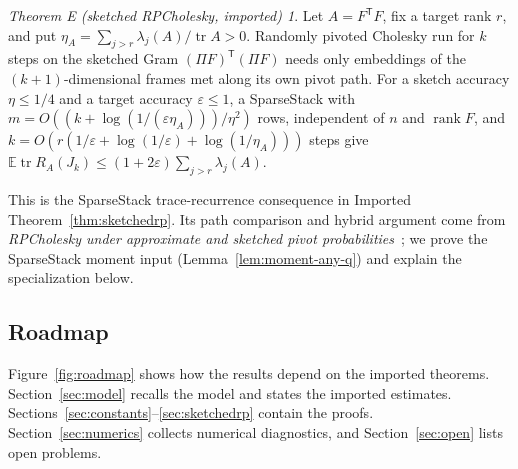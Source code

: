 \documentclass[11pt,a4paper]{article}
\theoremstyle{definition}
\theoremstyle{remark}
\newtheorem*{mainE}{Theorem E (sketched RPCholesky, imported)}
\newcommand{\E}{\mathbb E}
\newcommand{\tr}{\operatorname{tr}}
\newcommand{\rank}{\operatorname{rank}}
\newcommand{\eps}{\varepsilon}
\newcommand{\1}{\mathbf 1}
\newcommand{\T}{\mathsf T}
\begin{document}
\begin{mainE}
Let $A=F^\T F$, fix a target rank $r$, and put
$\eta_A=\sum_{j>r}\lambda_j(A)/\tr A>0$. Randomly pivoted Cholesky run for
$k$ steps on the sketched Gram $(\Pi F)^\T(\Pi F)$ needs only embeddings
of the $(k+1)$-dimensional frames met along its own pivot path. For a
sketch accuracy $\eta\le1/4$ and a target accuracy $\eps\le1$, a
SparseStack with $m=O((k+\log(1/(\eps\eta_A)))/\eta^2)$ rows, independent
of $n$ and $\rank F$, and $k=O(r(1/\eps+\log(1/\eps)+\log(1/\eta_A)))$
steps give $\E\tr R_A(J_k)\le(1+2\eps)\sum_{j>r}\lambda_j(A)$.
\end{mainE}
This is the SparseStack trace-recurrence consequence in Imported
Theorem~\ref{thm:sketchedrp}. Its path comparison and hybrid argument
come from \emph{RPCholesky under approximate and sketched pivot
probabilities}~\cite{RobustRP}; we prove the SparseStack moment input
(Lemma~\ref{lem:moment-any-q}) and explain the specialization below.

\subsection{Roadmap}
Figure~\ref{fig:roadmap} shows how the results depend on the imported
theorems. Section~\ref{sec:model} recalls the model and states the
imported estimates. Sections~\ref{sec:constants}--\ref{sec:sketchedrp}
contain the proofs. Section~\ref{sec:numerics} collects numerical
diagnostics, and Section~\ref{sec:open} lists open problems.
\end{document}
